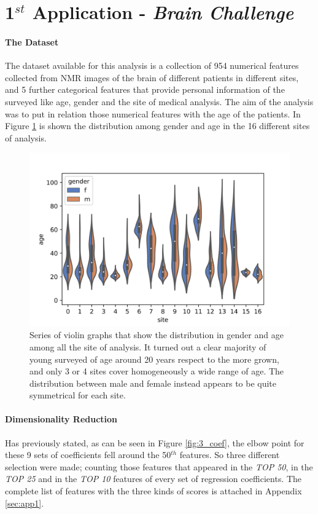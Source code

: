 \documentclass{article}
\begin{document}
\section*{1$^{st}$ Application - \emph{Brain Challenge}}
\paragraph{The Dataset}
The dataset available for this analysis is a collection of 954 numerical features collected from NMR images of the brain of different patients in different sites, and 5 further categorical features that provide personal information of the surveyed like age, gender and the site of medical analysis. The aim of the analysis was to put in relation those numerical features with the age of the patients. In Figure \ref{fig:gend_distr} is shown the distribution among gender and age in the 16 different sites of analysis.

\begin{figure}[h]
	\includegraphics[width=\textwidth]{violin_gender_site}
	\caption{Series of violin graphs that show the distribution in gender and age among all the site of analysis. It turned out a clear majority of young surveyed of age around 20 years respect to the more grown, and only 3 or 4 sites cover homogeneously a wide range of age. The distribution between male and female instead appears to be quite symmetrical for each site.  }
	\label{fig:gend_distr}
	\centering
\end{figure}

\paragraph{Dimensionality Reduction}
Has previously stated, as can be seen in Figure \ref{fig:3_coef}, the elbow point for these 9 sets of coefficients fell around the 50$^{th}$ features. So three different selection were made; counting those features that appeared in the \emph{TOP 50}, in the \emph{TOP 25} and in the \emph{TOP 10} features of every set of regression coefficients. The complete list of features with the three kinds of scores is attached in Appendix \ref{sec:app1}.
\end{document}
